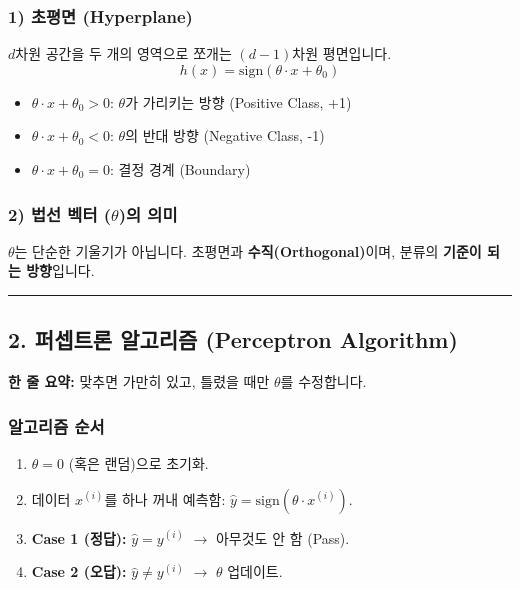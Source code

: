\documentclass[11pt,a4paper]{book}
\theoremstyle{definition}
\begin{document}
\subsubsection*{1) 초평면 (Hyperplane)}
$d$차원 공간을 두 개의 영역으로 쪼개는 $(d-1)$차원 평면입니다.
$$ h(x) = \text{sign}(\theta \cdot x + \theta_0) $$
\begin{itemize}
    \item $\theta \cdot x + \theta_0 > 0$: $\theta$가 가리키는 방향 (Positive Class, +1)
    \item $\theta \cdot x + \theta_0 < 0$: $\theta$의 반대 방향 (Negative Class, -1)
    \item $\theta \cdot x + \theta_0 = 0$: 결정 경계 (Boundary)
\end{itemize}

\subsubsection*{2) 법선 벡터 ($\theta$)의 의미}
$\theta$는 단순한 기울기가 아닙니다. 초평면과 \textbf{수직(Orthogonal)}이며, 분류의 \textbf{기준이 되는 방향}입니다.

\vspace{0.5cm}\hrule\vspace{0.5cm}

\subsection{2. 퍼셉트론 알고리즘 (Perceptron Algorithm)}

\begin{conceptbox}[title={개념 2: 실수에서 배운다 (Mistake Driven)}]
\textbf{한 줄 요약:} 맞추면 가만히 있고, 틀렸을 때만 $\theta$를 수정합니다.
\end{conceptbox}

\subsubsection*{알고리즘 순서}
\begin{enumerate}
    \item $\theta = 0$ (혹은 랜덤)으로 초기화.
    \item 데이터 $x^{(i)}$를 하나 꺼내 예측함: $\hat{y} = \text{sign}(\theta \cdot x^{(i)})$.
    \item \textbf{Case 1 (정답):} $\hat{y} = y^{(i)}$ $\rightarrow$ 아무것도 안 함 (Pass).
    \item \textbf{Case 2 (오답):} $\hat{y} \neq y^{(i)}$ $\rightarrow$ $\theta$ 업데이트.
\end{enumerate}
\end{document}

